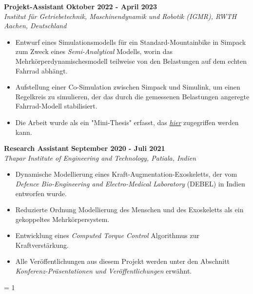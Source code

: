 \large{\textbf{Projekt-Assistant}}
\hfill
\large{\textbf{Oktober 2022 - April 2023}}\\
\emph{\large{Institut für Getriebetechnik, Maschinendynamik und Robotik (IGMR), RWTH Aachen, Deutschland}}
\begin{itemize}
	\item \large{Entwurf eines Simulationsmodells für ein Standard-Mountainbike in Simpack zum Zweck eines \emph{Semi-Analytical} Modells, worin das Mehrkörperdynamischesmodell teilweise von den Belastungen auf dem echten Fahrrad abhängt.}
	\item\large{Aufstellung einer Co-Simulation zwischen Simpack und Simulink, um einen Regelkreis zu simulieren, der das durch die gemessenen Belastungen angeregte Fahrrad-Modell stabilisiert.}
	\item\large{Die Arbeit wurde als ein "Mini-Thesis" erfasst, das \href{https://github.com/average-engineer/MiniThesis_IGMR/blob/master/Thesis.pdf}{\large{\textit{hier}}} zugegriffen werden kann.}
\end{itemize}

\vspace{0.1 in}

\large{\textbf{Research Assistant}}
\hfill
\large{\textbf{September 2020 - Juli 2021}}\\
\emph{\large{Thapar Institute of Engineering and Technology, Patiala, Indien}}
\begin{itemize}
	\item\large{Dynamische Modellierung eines Kraft-Augmentation-Exoskeletts, der vom \emph{Defence Bio-Engineering and Electro-Medical Laboratory} (DEBEL) in Indien entworfen wurde.}
	\item\large{Reduzierte Ordnung Modellierung des Menschen und des Exoskeletts als ein gekoppeltes Mehrkörpersystem.}
	\item\large{Entwicklung eines \emph{Computed Torque Control} Algorithmus zur Kraftverstärkung.}
	\item\large{Alle Veröffentlichungen aus diesem Projekt werden unter den Abschnitt \emph{Konferenz-Präsentationen und Veröffentlichungen} erwähnt. }
\end{itemize}

\ifnum\teach = 1
	\vspace{0.1 in}

